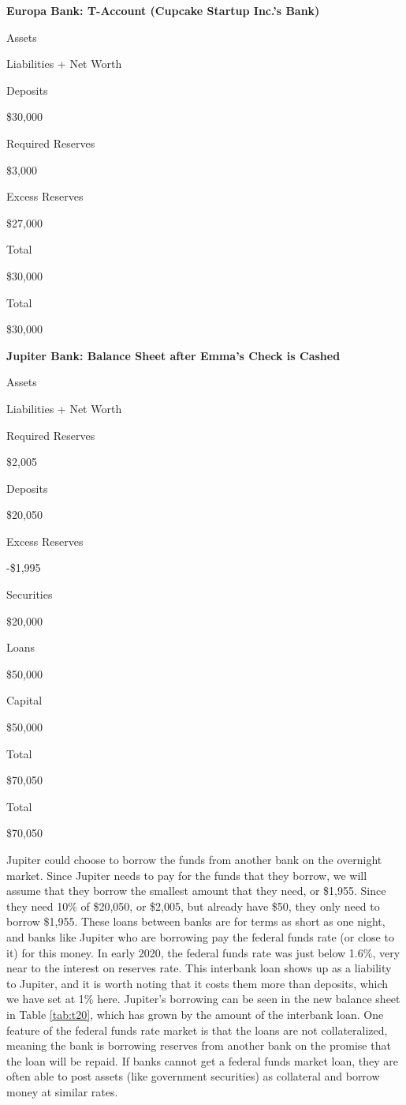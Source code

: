 \documentclass[
]{book}
\begin{document}
\label{tab:t17}\textbf{Europa Bank: T-Account (Cupcake Startup Inc.'s Bank)}

Assets

Liabilities + Net Worth

Deposits

\$30,000

Required Reserves

\$3,000

Excess Reserves

\$27,000

Total

\$30,000

Total

\$30,000

\label{tab:t18}\textbf{Jupiter Bank: Balance Sheet after Emma's Check is Cashed}

Assets

Liabilities + Net Worth

Required Reserves

\$2,005

Deposits

\$20,050

Excess Reserves

-\$1,995

Securities

\$20,000

Loans

\$50,000

Capital

\$50,000

Total

\$70,050

Total

\$70,050

Jupiter could choose to borrow the funds from another bank on the overnight market. Since Jupiter needs to pay for the funds that they borrow, we will assume that they borrow the smallest amount that they need, or \$1,955. Since they need 10\% of \$20,050, or \$2,005, but already have \$50, they only need to borrow \$1,955. These loans between banks are for terms as short as one night, and banks like Jupiter who are borrowing pay the federal funds rate (or close to it) for this money. In early 2020, the federal funds rate was just below 1.6\%, very near to the interest on reserves rate. This interbank loan shows up as a liability to Jupiter, and it is worth noting that it costs them more than deposits, which we have set at 1\% here. Jupiter's borrowing can be seen in the new balance sheet in Table \ref{tab:t20}, which has grown by the amount of the interbank loan. One feature of the federal funds rate market is that the loans are not collateralized, meaning the bank is borrowing reserves from another bank on the promise that the loan will be repaid. If banks cannot get a federal funds market loan, they are often able to post assets (like government securities) as collateral and borrow money at similar rates.
\end{document}
